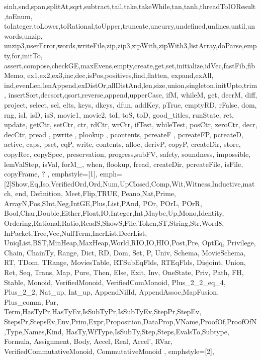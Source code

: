 {{    sinh,snd,span,splitAt,sqrt,subtract,tail,take,takeWhile,tan,tanh,threadToIOResult,toEnum,
    toInteger,toLower,toRational,toUpper,truncate,uncurry,undefined,unlines,until,unwords,unzip,
    unzip3,userError,words,writeFile,zip,zip3,zipWith,zipWith3,listArray,doParse,empty,for,initTo,
        assert,compose,checkGE,maxEvens,empty,create,get,set,initialize,idVec,fastFib,fibMemo,
        ex1,ex2,ex3,inc,dec,isPos,positives,find,flatten, expand,exAll,
        ind,evenLen,lenAppend,exDistOr,allDistAnd,len,size,union,singleton,initUpto,trim,
        insertSort,decsort,qsort,reverse,append,upperCase, ifM, whileM, get, decrM, diff,
        project, select, sel, elts, keys, dkeys, dfun, addKey, pTrue, emptyRD, rFalse,
                dom, rng, isI, isD, isS, movie1, movie2,  toI, toS, toD, good_titles, runState, ret,
                update, getCtr, setCtr, ctr, rdCtr, wrCtr, ifTest, whileTest, posCtr, zeroCtr, decr, decCtr,
                pread , pwrite , plookup , pcontents, pcreateF , pcreateFP, pcreateD, active, caps, pset, eqP,
                write, contents, alloc, derivP, copyP, createDir, store, copyRec, copySpec,
                preservation, progress,subFV, safety, soundness, impossible, lemValStep, isVal,
                forM_, when, flookup, fread, createDir, pcreateFile, isFile, copyFrame, ?
  },
  emphstyle={[1]\color{haskellblue}},
  emph=
  {[2]Show,Eq,Iso,VerifiedOrd,Ord,Num,UpClosed,Comp,Wit,Witness,Inductive,match, end, Definition, Meet,Flip,TRUE,
      Peano,Nat,Prime, ArrayN,Pos,SInt,Neg,IntGE,Plus,List,PAnd, POr, POrL, POrR,
        Bool,Char,Double,Either,Float,IO,Integer,Int,Maybe,Up,Mono,Identity,
        Ordering,Rational,Ratio,ReadS,ShowS,File,Token,ST,String,Str,Word8,
        InPacket,Tree,Vec,NullTerm,IncrList,DecrList,
        UniqList,BST,MinHeap,MaxHeap,World,RIO,IO,HIO,Post,Pre, OptEq,
        Privilege, Chain, ChainTy, Range, Dict, RD, Dom, Set, P, Univ, Schema, MovieSchema, RT,
        TDom, TRange, MoviesTable, RTSubEqFlds, RTEqFlds, Disjoint, Union, Ret, Seq, Trans, Map,
        Pure, Then, Else, Exit, Inv, OneState, Priv, Path, FH, Stable,
      Monoid, VerifiedMonoid, VerifiedComMonoid, Plus_2_2_eq_4, Plus_2_2, Nat_up, Int_up,
      AppendNilId, AppendAssoc,MapFusion,
      Plus_comm, Par, Term,HasTyPr,HasTyEv,IsSubTyPr,IsSubTyEv,StepPr,StepEv, StepsPr,StepsEv,Env,Prim,Expr,Proposition,DataProp,VName,ProofOf,ProofOfN,Type,Names,Kind,
      HasTy,WfType,IsSubTy,Step,Steps,EvalsTo,Subtype,
      Formula, Assignment, Body, Accel, Real, Accel', RVar, VerifiedCommutativeMonoid, CommutativeMonoid
  },
  emphstyle={[2]\color{blue_violet}},
}
